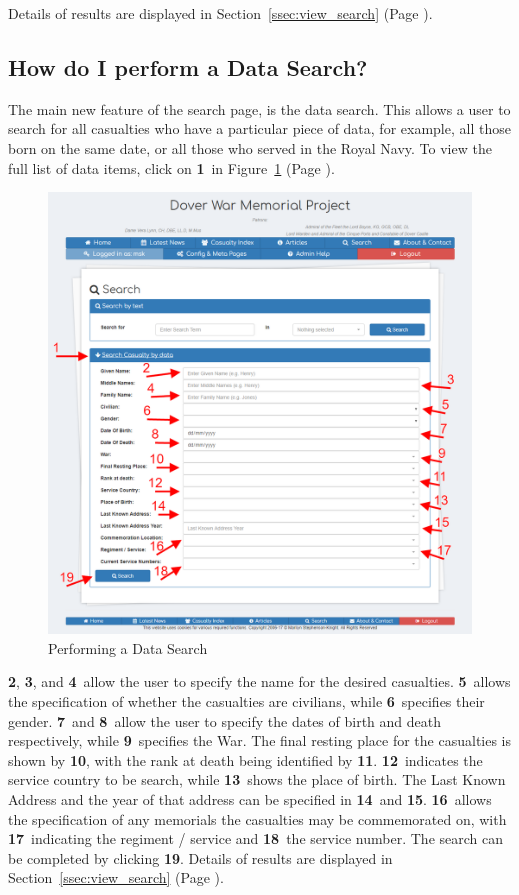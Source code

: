\documentclass[12pt]{article}
\newcommand{\marker}[1]{\color{red}\textbf{#1}\color{black}}
\newcommand{\myref}[1]{\ref{#1} {\scriptsize(Page \pageref{#1})}}
\begin{document}
Details of results are displayed in Section~\myref{ssec:view_search}.

\newpage
\FloatBarrier
\subsection{How do I perform a Data Search?}\label{ssec:data_search}
The main new feature of the search page, is the data search. This allows a user to search for all casualties who have a particular piece of data, for example, all those born on the same date, or all those who served in the Royal Navy. To view the full list of data items, click on \marker{1}\ in Figure~\myref{fig:data_search}.

\begin{figure}[h]
  \centering
 \includegraphics[width=.9\textwidth]{pics/data_search.png}
	\caption{Performing a Data Search}\label{fig:data_search}
\end{figure}

\marker{2}, \marker{3}, and \marker{4}\ allow the user to specify the name for the desired casualties. \marker{5}\ allows the specification of whether the casualties are civilians, while \marker{6}\ specifies their gender. \marker{7}\ and \marker{8}\ allow the user to specify the dates of birth and death respectively, while \marker{9}\ specifies the War. The final resting place for the casualties is shown by \marker{10}, with the rank at death being identified by \marker{11}. \marker{12}\ indicates the service country to be search, while \marker{13}\ shows the place of birth. The Last Known Address and the year of that address can be specified in \marker{14}\ and \marker{15}. \marker{16}\ allows the specification of any memorials the casualties may be commemorated on, with \marker{17}\ indicating the regiment / service and \marker{18}\ the service number. The search can be completed by clicking \marker{19}. Details of results are displayed in Section~\myref{ssec:view_search}.
\end{document}
